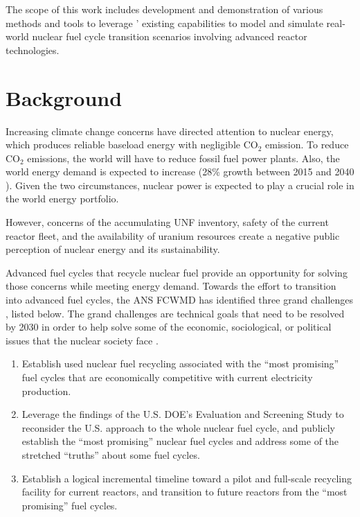 The scope of this work includes development and demonstration of
various methods and tools to leverage \Cyclus' existing
capabilities to model and simulate real-world nuclear fuel cycle
transition scenarios involving advanced reactor technologies.


\section{Background}
Increasing climate change concerns have directed attention
to nuclear energy, which produces reliable baseload energy
with negligible CO$_2$ emission. To reduce CO$_2$ emissions,
the world will have to reduce fossil fuel power plants.
Also, the world energy demand is expected to increase
(28\% growth between 2015 and 2040 \cite{conti_international_2016}).
Given the two circumstances,
nuclear power is expected to play a crucial role in the world energy portfolio.

However, concerns of the accumulating \gls{UNF} inventory,
safety of the current reactor fleet, and the availability of
uranium resources create a negative public perception of
nuclear energy and its sustainability.

Advanced fuel cycles that recycle nuclear fuel 
provide an opportunity for solving those concerns while
meeting energy demand. Towards the effort to transition
into advanced fuel cycles, the \gls{ANS} \gls{FCWMD} has identified
three grand challenges \cite{huff_message_2017}, listed below. The grand
challenges are technical goals that need to be resolved by
2030 in order to help solve some of the economic, sociological,
or political issues that the nuclear society face \cite{american_nuclear_society_ans_2017}.

\begin{enumerate}
	\item Establish used nuclear fuel recycling associated with the
	``most promising'' fuel cycles that are economically competitive
	with current electricity production.
	\item Leverage the findings of the U.S. \gls{DOE}'s Evaluation
	and Screening Study to reconsider the U.S. approach to the whole
	nuclear fuel cycle, and publicly establish the ``most promising''
	nuclear fuel cycles and address some of the stretched ``truths''
	about some fuel cycles.
	\item Establish a logical incremental timeline toward a pilot
	and full-scale recycling facility for current reactors, and
	transition to future reactors from the ``most promising'' fuel cycles.
\end{enumerate}

